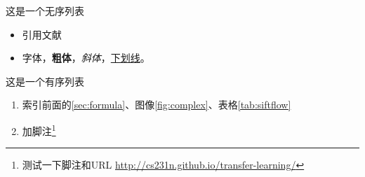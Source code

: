 这是一个无序列表
\begin{itemize}
	\item 引用文献\cite{long2015fully}
	\item 字体{\color{red}{变红}}，\textbf{粗体}，\textit{斜体}，\underline{下划线}。
\end{itemize}

这是一个有序列表
\begin{enumerate}
	\item 索引前面的\autoref{sec:formula}、图像\ref{fig:complex}、表格\ref{tab:siftflow}
	\item 加脚注\footnote{测{试一下}脚注和URL \url{http://cs231n.github.io/transfer-learning/}}
\end{enumerate}


